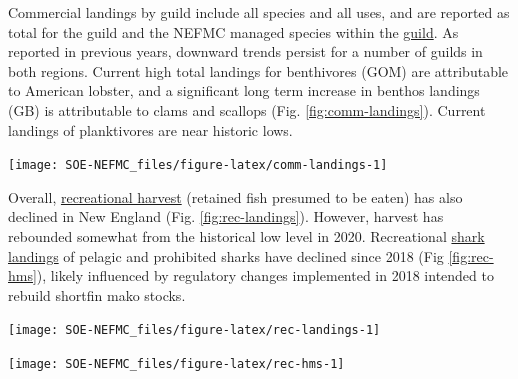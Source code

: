 \documentclass[
  10pt,
]{article}
\let\origfigure\figure
\let\endorigfigure\endfigure
\renewenvironment{figure}[1][2] {
    \expandafter\origfigure\expandafter[H]
} {
    \endorigfigure
}
\begin{document}
Commercial landings by guild include all species and all uses, and are reported as total for the guild and the NEFMC managed species within the \href{https://noaa-edab.github.io/catalog/aggregate_biomass.html}{guild}. As reported in previous years, downward trends persist for a number of guilds in both regions. Current high total landings for benthivores (GOM) are attributable to American lobster, and a significant long term increase in benthos landings (GB) is attributable to clams and scallops (Fig. \ref{fig:comm-landings}). Current landings of planktivores are near historic lows.

\begin{figure}

{\centering \texttt{[image: SOE-NEFMC\_files/figure-latex/comm-landings-1]} 

}

\caption{Total commercial landings (black) and NEFMC managed U.S seafood landings (red) by feeding guild for the Gulf of Maine (GOM, right) and Georges Bank (GB, left).}\label{fig:comm-landings}
\end{figure}

Overall, \href{https://noaa-edab.github.io/catalog/recdat.html}{recreational harvest} (retained fish presumed to be eaten) has also declined in New England (Fig. \ref{fig:rec-landings}). However, harvest has rebounded somewhat from the historical low level in 2020. Recreational \href{https://noaa-edab.github.io/catalog/rec_hms.html}{shark landings} of pelagic and prohibited sharks have declined since 2018 (Fig \ref{fig:rec-hms}), likely influenced by regulatory changes implemented in 2018 intended to rebuild shortfin mako stocks.

\begin{figure}

{\centering \texttt{[image: SOE-NEFMC\_files/figure-latex/rec-landings-1]} 

}

\caption{Total recreational seafood harvest (millions of pounds) in the New England region.}\label{fig:rec-landings}
\end{figure}
\begin{figure}

{\centering \texttt{[image: SOE-NEFMC\_files/figure-latex/rec-hms-1]} 

}

\caption{Recreational shark landings from Large Pelagics Survey.}\label{fig:rec-hms}
\end{figure}
\end{document}
